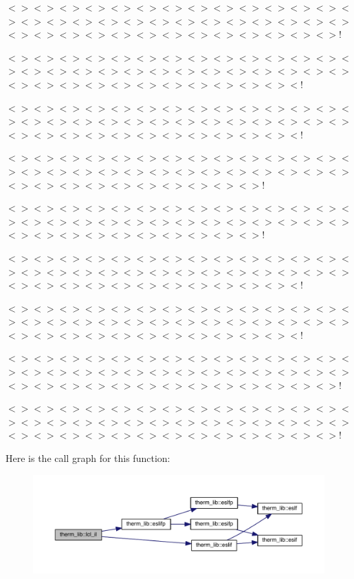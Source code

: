 $<$$>$$<$$>$$<$$>$$<$$>$$<$$>$$<$$>$$<$$>$$<$$>$$<$$>$$<$$>$$<$$>$$<$$>$$<$$>$$<$$>$$<$$>$$<$$>$$<$$>$$<$$>$$<$$>$$<$$>$$<$$>$$<$$>$$<$$>$$<$$>$$<$$>$$<$$>$$<$$>$$<$$>$$<$$>$$<$$>$$<$$>$$<$$>$$<$$>$$<$$>$$<$$>$$<$$>$$<$$>$$<$$>$$<$$>$$<$$>$!

$<$$>$$<$$>$$<$$>$$<$$>$$<$$>$$<$$>$$<$$>$$<$$>$$<$$>$$<$$>$$<$$>$$<$$>$$<$$>$$<$$>$$<$$>$$<$$>$$<$$>$$<$$>$$<$$>$$<$$>$$<$$>$$<$$>$$<$$>$$<$$>$$<$$>$$<$$>$$<$$>$$<$$>$$<$$>$$<$$>$$<$$>$$<$$>$$<$$>$$<$$>$$<$$>$$<$$>$$<$$>$$<$$>$$<$!

$<$$>$$<$$>$$<$$>$$<$$>$$<$$>$$<$$>$$<$$>$$<$$>$$<$$>$$<$$>$$<$$>$$<$$>$$<$$>$$<$$>$$<$$>$$<$$>$$<$$>$$<$$>$$<$$>$$<$$>$$<$$>$$<$$>$$<$$>$$<$$>$$<$$>$$<$$>$$<$$>$$<$$>$$<$$>$$<$$>$$<$$>$$<$$>$$<$$>$$<$$>$$<$$>$$<$$>$$<$$>$$<$$>$$<$!

$<$$>$$<$$>$$<$$>$$<$$>$$<$$>$$<$$>$$<$$>$$<$$>$$<$$>$$<$$>$$<$$>$$<$$>$$<$$>$$<$$>$$<$$>$$<$$>$$<$$>$$<$$>$$<$$>$$<$$>$$<$$>$$<$$>$$<$$>$$<$$>$$<$$>$$<$$>$$<$$>$$<$$>$$<$$>$$<$$>$$<$$>$$<$$>$$<$$>$$<$$>$$<$$>$$<$$>$$<$$>$!

$<$$>$$<$$>$$<$$>$$<$$>$$<$$>$$<$$>$$<$$>$$<$$>$$<$$>$$<$$>$$<$$>$$<$$>$$<$$>$$<$$>$$<$$>$$<$$>$$<$$>$$<$$>$$<$$>$$<$$>$$<$$>$$<$$>$$<$$>$$<$$>$$<$$>$$<$$>$$<$$>$$<$$>$$<$$>$$<$$>$$<$$>$$<$$>$$<$$>$$<$$>$$<$$>$$<$$>$$<$$>$!

$<$$>$$<$$>$$<$$>$$<$$>$$<$$>$$<$$>$$<$$>$$<$$>$$<$$>$$<$$>$$<$$>$$<$$>$$<$$>$$<$$>$$<$$>$$<$$>$$<$$>$$<$$>$$<$$>$$<$$>$$<$$>$$<$$>$$<$$>$$<$$>$$<$$>$$<$$>$$<$$>$$<$$>$$<$$>$$<$$>$$<$$>$$<$$>$$<$$>$$<$$>$$<$$>$$<$$>$$<$$>$$<$$>$$<$!

$<$$>$$<$$>$$<$$>$$<$$>$$<$$>$$<$$>$$<$$>$$<$$>$$<$$>$$<$$>$$<$$>$$<$$>$$<$$>$$<$$>$$<$$>$$<$$>$$<$$>$$<$$>$$<$$>$$<$$>$$<$$>$$<$$>$$<$$>$$<$$>$$<$$>$$<$$>$$<$$>$$<$$>$$<$$>$$<$$>$$<$$>$$<$$>$$<$$>$$<$$>$$<$$>$$<$$>$$<$$>$$<$$>$$<$!

$<$$>$$<$$>$$<$$>$$<$$>$$<$$>$$<$$>$$<$$>$$<$$>$$<$$>$$<$$>$$<$$>$$<$$>$$<$$>$$<$$>$$<$$>$$<$$>$$<$$>$$<$$>$$<$$>$$<$$>$$<$$>$$<$$>$$<$$>$$<$$>$$<$$>$$<$$>$$<$$>$$<$$>$$<$$>$$<$$>$$<$$>$$<$$>$$<$$>$$<$$>$$<$$>$$<$$>$$<$$>$$<$$>$$<$$>$$<$$>$!

$<$$>$$<$$>$$<$$>$$<$$>$$<$$>$$<$$>$$<$$>$$<$$>$$<$$>$$<$$>$$<$$>$$<$$>$$<$$>$$<$$>$$<$$>$$<$$>$$<$$>$$<$$>$$<$$>$$<$$>$$<$$>$$<$$>$$<$$>$$<$$>$$<$$>$$<$$>$$<$$>$$<$$>$$<$$>$$<$$>$$<$$>$$<$$>$$<$$>$$<$$>$$<$$>$$<$$>$$<$$>$$<$$>$$<$$>$$<$$>$! 

Here is the call graph for this function\+:\nopagebreak
\begin{figure}[H]
\begin{center}
\leavevmode
\includegraphics[width=350pt]{namespacetherm__lib_a0b1c333335dfb4af1c56bc56a0e45440_cgraph}
\end{center}
\end{figure}




